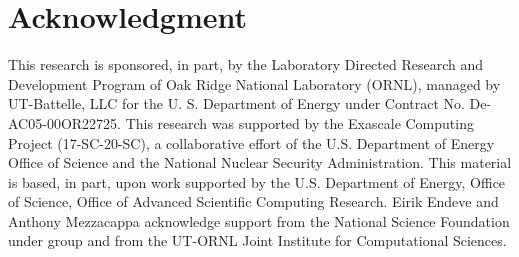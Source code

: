 \section{Acknowledgment} \label{se:Acknowledgment}

This research is sponsored, in part, by the Laboratory Directed Research and Development Program of Oak Ridge National Laboratory (ORNL), managed by UT-Battelle, LLC for the U. S. Department of Energy under Contract No. De-AC05-00OR22725.  
This research was supported by the Exascale Computing Project (17-SC-20-SC), a collaborative effort of the U.S. Department of Energy Office of Science and the National Nuclear Security Administration.  
This material is based, in part, upon work supported by the U.S. Department of Energy, Office of Science, Office of Advanced Scientific Computing Research.
Eirik Endeve and Anthony Mezzacappa acknowledge support from the National Science Foundation under group  and from the UT-ORNL Joint Institute for Computational Sciences.
